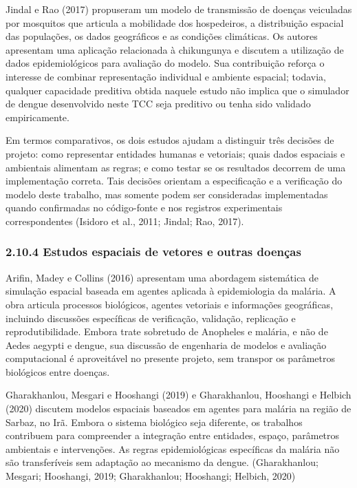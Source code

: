 Jindal e Rao (2017) propuseram um modelo de transmissão de doenças
veiculadas por mosquitos que articula a mobilidade dos hospedeiros, a
distribuição espacial das populações, os dados geográficos e as
condições climáticas. Os autores apresentam uma aplicação relacionada à
chikungunya e discutem a utilização de dados epidemiológicos para
avaliação do modelo. Sua contribuição reforça o interesse de combinar
representação individual e ambiente espacial; todavia, qualquer
capacidade preditiva obtida naquele estudo não implica que o simulador
de dengue desenvolvido neste TCC seja preditivo ou tenha sido validado
empiricamente.

Em termos comparativos, os dois estudos ajudam a distinguir três
decisões de projeto: como representar entidades humanas e vetoriais;
quais dados espaciais e ambientais alimentam as regras; e como testar se
os resultados decorrem de uma implementação correta. Tais decisões
orientam a especificação e a verificação do modelo deste trabalho, mas
somente podem ser consideradas implementadas quando confirmadas no
código-fonte e nos registros experimentais correspondentes (Isidoro et
al., 2011; Jindal; Rao, 2017).

\subsubsection{2.10.4 Estudos espaciais de vetores e outras
doenças}\label{estudos-espaciais-de-vetores-e-outras-doenuxe7as}

Arifin, Madey e Collins (2016) apresentam uma abordagem sistemática de
simulação espacial baseada em agentes aplicada à epidemiologia da
malária. A obra articula processos biológicos, agentes vetoriais e
informações geográficas, incluindo discussões específicas de
verificação, validação, replicação e reprodutibilidade. Embora trate
sobretudo de Anopheles e malária, e não de Aedes aegypti e dengue, sua
discussão de engenharia de modelos e avaliação computacional é
aproveitável no presente projeto, sem transpor os parâmetros biológicos
entre doenças.

Gharakhanlou, Mesgari e Hooshangi (2019) e Gharakhanlou, Hooshangi e
Helbich (2020) discutem modelos espaciais baseados em agentes para
malária na região de Sarbaz, no Irã. Embora o sistema biológico seja
diferente, os trabalhos contribuem para compreender a integração entre
entidades, espaço, parâmetros ambientais e intervenções. As regras
epidemiológicas específicas da malária não são transferíveis sem
adaptação ao mecanismo da dengue. (Gharakhanlou; Mesgari; Hooshangi,
2019; Gharakhanlou; Hooshangi; Helbich, 2020)

